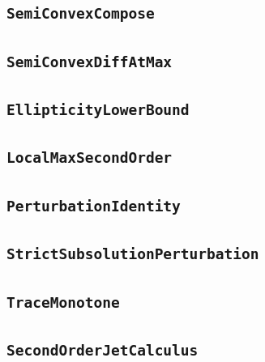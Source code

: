 \documentclass[11pt]{amsart}
\theoremstyle{definition}
\begin{document}
\subsection{\texorpdfstring{\texttt{SemiConvexCompose}}{SemiConvexCompose}}\label{node:SemiConvexCompose}


\subsection{\texorpdfstring{\texttt{SemiConvexDiffAtMax}}{SemiConvexDiffAtMax}}\label{node:SemiConvexDiffAtMax}


\subsection{\texorpdfstring{\texttt{EllipticityLowerBound}}{EllipticityLowerBound}}\label{node:EllipticityLowerBound}


\subsection{\texorpdfstring{\texttt{LocalMaxSecondOrder}}{LocalMaxSecondOrder}}\label{node:LocalMaxSecondOrder}


\subsection{\texorpdfstring{\texttt{PerturbationIdentity}}{PerturbationIdentity}}\label{node:PerturbationIdentity}


\subsection{\texorpdfstring{\texttt{StrictSubsolutionPerturbation}}{StrictSubsolutionPerturbation}}\label{node:StrictSubsolutionPerturbation}


\subsection{\texorpdfstring{\texttt{TraceMonotone}}{TraceMonotone}}\label{node:TraceMonotone}


\subsection{\texorpdfstring{\texttt{SecondOrderJetCalculus}}{SecondOrderJetCalculus}}\label{node:SecondOrderJetCalculus}

\end{document}
